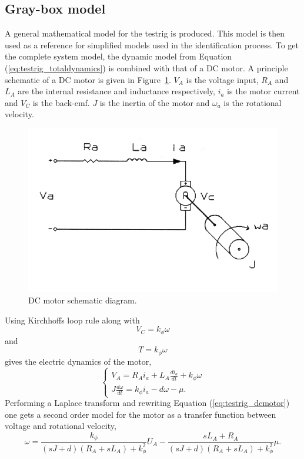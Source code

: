\subsection{Gray-box model}
A general mathematical model for the testrig is produced. This model is then used
as a reference for simplified models used in the identification process.
To get the complete system model, the dynamic model from
Equation (\ref{eq:testrig_totaldynamics}) is combined with that of a DC motor. A
principle schematic of a DC motor is given in
Figure~\ref{fig:testrig_dcmotor_model}. $V_A$ is the voltage input, $R_A$ and
$L_A$ are the internal resistance and inductance respectively, $i_a$ is the
motor current and $V_C$ is the back-emf. $J$ is the inertia of the motor and
$\omega_a$ is the rotational velocity.
\begin{figure}[H]
    \centering
    \includegraphics[width=\textwidth]{./img/testrig_dcmotor_model.png}
    \caption{DC motor schematic diagram.}\label{fig:testrig_dcmotor_model}
\end{figure}
Using Kirchhoffs loop rule along with 
\begin{equation} \label{eq:testrig_kphi_v}
    V_C = k_{\phi} \omega
\end{equation}
and 
\begin{equation} \label{eq:testrig_kphi_i}
    T = k_{\phi} \omega
\end{equation}
gives the electric dynamics of the motor,
\begin{equation} \label{eq:testrig_dcmotor}
    \begin{cases} 
        V_A = R_A i_a + L_A \frac{di_a}{dt} + k_{\phi}\omega \\
        J \frac{d\omega} {dt} = k_{\phi} i_a - d\omega - \mu. 
    \end{cases}
\end{equation}
Performing a Laplace transform and rewriting Equation (\ref{eq:testrig_dcmotor})
one gets a second order model for the motor as a transfer function between
voltage and rotational velocity,
\begin{equation} \label{eq:testrig_motor_2ndorder}
    \omega = \frac {k_{\phi}} {(sJ + d) (R_A + sL_A) + k_{\phi}^2} U_A -
    \frac {sL_A + R_A} {(sJ + d) (R_A + sL_A) + k_{\phi}^2} \mu.
\end{equation}
